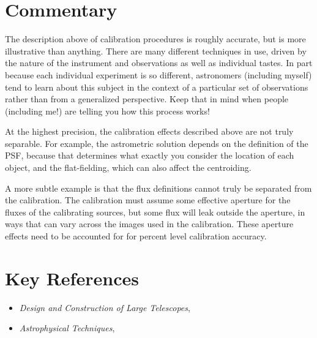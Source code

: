 \section{Commentary}

The description above of calibration procedures is roughly accurate,
but is more illustrative than anything. There are many different
techniques in use, driven by the nature of the instrument and
observations as well as individual tastes. In part because each
individual experiment is so different, astronomers (including myself)
tend to learn about this subject in the context of a particular set of
observations rather than from a generalized perspective. Keep that in
mind when people (including me!) are telling you how this process
works!

At the highest precision, the calibration effects described above are
not truly separable. For example, the astrometric solution depends on
the definition of the PSF, because that determines what exactly you
consider the location of each object, and the flat-fielding, which can
also affect the centroiding.

A more subtle example is that the flux definitions cannot truly be
separated from the calibration. The calibration must assume some
effective aperture for the fluxes of the calibrating sources, but some
flux will leak outside the aperture, in ways that can vary across the
images used in the calibration. These aperture effects need to be
accounted for for percent level calibration accuracy.

\section{Key References}

\begin{itemize}
  \item
    {\it Design and Construction of Large Telescopes},
      \citet{bely03a}
  \item
    {\it Astrophysical Techniques}, \citet{kitchin09a}
\end{itemize}


